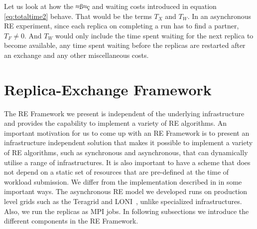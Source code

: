 \documentclass{rspublic}
\newcommand{\jhanote}[1]{ {\textcolor{red} { ***shantenu: #1 }}}
\newcommand{\alnote}[1]{ {\textcolor{blue} { ***andre: #1 }}}
\newcommand{\athotanote}[1]{ {\textcolor{green} { ***athota: #1 }}}
\newcommand{\alnote}[1]{}
\newcommand{\athotanote}[1]{}
\newcommand{\jhanote}[1]{}
\begin{document}
Let us look at how the ≈ß≈ç and waiting costs introduced in
equation \ref{eq:totaltime2} behave. That would be the terms $T_{X}$
and $T_W$. In an asynchronous RE experiment, since each replica on
completing a run has to find a partner, $T_F \neq 0$. And $T_W$ would
only include the time spent waiting for the next replica to become
available, any time spent waiting before the replicas are restarted
after an exchange and any other miscellaneous costs.




\section{Replica-Exchange Framework}

The RE Framework we present is independent of the underlying infrastructure and provides the capability to implement a variety of RE algorithms. 
An important motivation for us to come up with an RE Framework is to present an infrastructure independent solution that makes it possible to implement a variety of RE algorithms, such as synchronous and asynchronous, that can dynamically utilise a range of infrastructures.
 It is also important to have a scheme
that does not depend on a static set of resources that are pre-defined
at the time of workload submission.  
   We differ from the implementation described
in \citep{parashar_arepex} in some important ways.  The asynchronous
RE model we developed runs on production level grids such as the
Teragrid and LONI~\citep{LONI_web}, unlike specialized
infrastructures. %
Also, we run the replicas as MPI jobs. In following subsections we introduce the different components in the RE Framework. 
  
\end{document}
